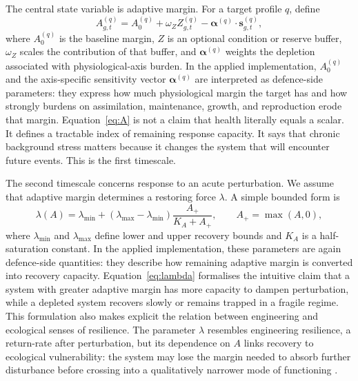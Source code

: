 	The central state variable is adaptive margin. For a target profile $q$, define
	\begin{equation}
		A^{(q)}_{g,t}
		= A^{(q)}_0 + \omega_Z Z^{(q)}_{g,t} - \bm{\alpha}^{(q)}\cdot \mathbf{s}^{(q)}_{g,t},
		\label{eq:A}
	\end{equation}
	where $A^{(q)}_0$ is the baseline margin, $Z$ is an optional condition or reserve buffer, $\omega_Z$ scales the contribution of that buffer, and $\bm{\alpha}^{(q)}$ weights the depletion associated with physiological-axis burden. In the applied implementation, $A_0^{(q)}$ and the axis-specific sensitivity vector $\bm{\alpha}^{(q)}$ are interpreted as defence-side parameters: they express how much physiological margin the target has and how strongly burdens on assimilation, maintenance, growth, and reproduction erode that margin. Equation~\eqref{eq:A} is not a claim that health literally equals a scalar. It defines a tractable index of remaining response capacity. It says that chronic background stress matters because it changes the system that will encounter future events. This is the first timescale.
	
	The second timescale concerns response to an acute perturbation. We assume that adaptive margin determines a restoring force $\lambda$. A simple bounded form is
	\begin{equation}
		\lambda(A) = \lambda_{\min} + (\lambda_{\max}-\lambda_{\min})\frac{A_+}{K_A + A_+},
		\qquad A_+ = \max(A,0),
		\label{eq:lambda}
	\end{equation}
	where $\lambda_{\min}$ and $\lambda_{\max}$ define lower and upper recovery bounds and $K_A$ is a half-saturation constant. In the applied implementation, these parameters are again defence-side quantities: they describe how remaining adaptive margin is converted into recovery capacity. Equation~\eqref{eq:lambda} formalises the intuitive claim that a system with greater adaptive margin has more capacity to dampen perturbation, while a depleted system recovers slowly or remains trapped in a fragile regime. This formulation also makes explicit the relation between engineering and ecological senses of resilience. The parameter $\lambda$ resembles engineering resilience, a return-rate after perturbation, but its dependence on $A$ links recovery to ecological vulnerability: the system may lose the margin needed to absorb further disturbance before crossing into a qualitatively narrower mode of functioning \citep{rapport1998ecosystem,scheffer2009early}.
	
